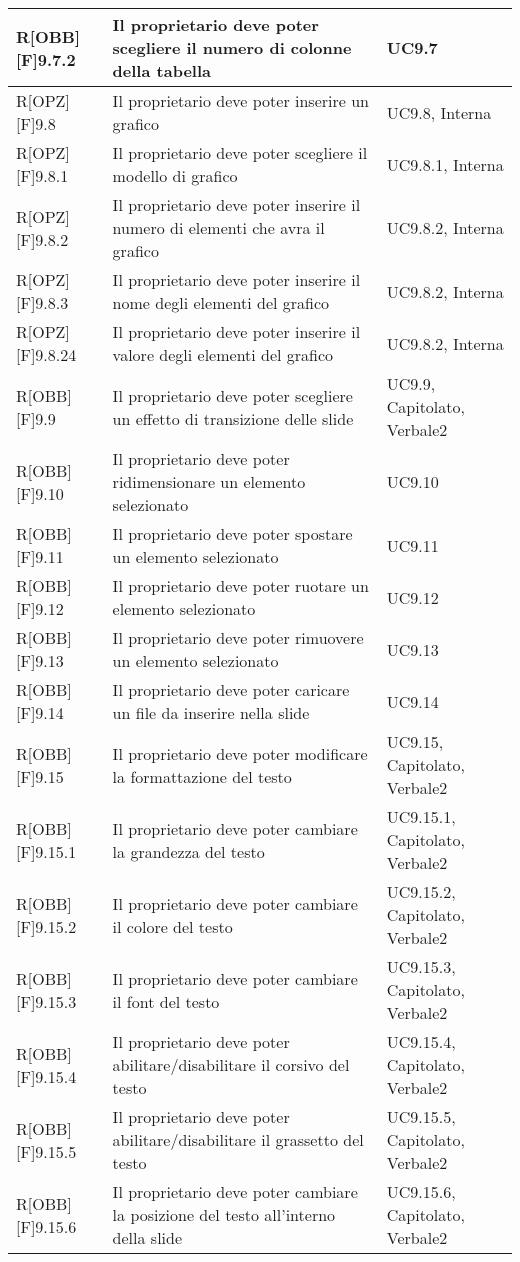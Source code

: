	\begin{table}[h]
		\begin{tabular}{|p{}|p{}|p{}|}
			\midrule
			
R[OBB][F]9.7.2 & Il proprietario deve poter scegliere il numero di colonne della tabella & UC9.7 \\ \midrule
R[OPZ][F]9.8 & Il proprietario deve poter inserire un grafico & UC9.8, Interna \\ \midrule
R[OPZ][F]9.8.1 & Il proprietario deve poter scegliere il modello di grafico  & UC9.8.1, Interna \\ \midrule
R[OPZ][F]9.8.2 & Il proprietario deve poter inserire il numero di elementi che avra il grafico & UC9.8.2, Interna \\ \midrule
R[OPZ][F]9.8.3 & Il proprietario deve poter inserire il nome degli elementi del grafico  & UC9.8.2, Interna \\ \midrule
R[OPZ][F]9.8.24 & Il proprietario deve poter inserire il valore degli elementi del grafico & UC9.8.2, Interna \\ \midrule
R[OBB][F]9.9 & Il proprietario deve poter scegliere un effetto di transizione delle slide & UC9.9, Capitolato, Verbale2 \\ \midrule
R[OBB][F]9.10 & Il proprietario deve poter ridimensionare un elemento selezionato & UC9.10 \\ \midrule
R[OBB][F]9.11 & Il proprietario deve poter spostare un elemento selezionato & UC9.11 \\ \midrule
R[OBB][F]9.12 & Il proprietario deve poter ruotare un elemento selezionato & UC9.12 \\ \midrule
R[OBB][F]9.13 & Il proprietario deve poter rimuovere un elemento selezionato & UC9.13 \\ \midrule
R[OBB][F]9.14 & Il proprietario deve poter caricare un file da inserire nella slide & UC9.14 \\ \midrule
R[OBB][F]9.15 & Il proprietario deve poter modificare la formattazione del testo & UC9.15, Capitolato, Verbale2 \\ \midrule
R[OBB][F]9.15.1 & Il proprietario deve poter cambiare la grandezza del testo & UC9.15.1, Capitolato, Verbale2 \\ \midrule
R[OBB][F]9.15.2 & Il proprietario deve poter cambiare il colore del testo & UC9.15.2, Capitolato, Verbale2 \\ \midrule
R[OBB][F]9.15.3 & Il proprietario deve poter cambiare il font del testo & UC9.15.3, Capitolato, Verbale2 \\ \midrule
R[OBB][F]9.15.4 & Il proprietario deve poter abilitare/disabilitare il corsivo del testo & UC9.15.4, Capitolato, Verbale2 \\ \midrule
R[OBB][F]9.15.5 & Il proprietario deve poter abilitare/disabilitare il grassetto del testo & UC9.15.5, Capitolato, Verbale2 \\ \midrule
R[OBB][F]9.15.6 & Il proprietario deve poter cambiare la posizione del testo all'interno della slide & UC9.15.6, Capitolato, Verbale2 \\ \midrule

		\end{tabular}
	\end{table}
	\newpage
	
